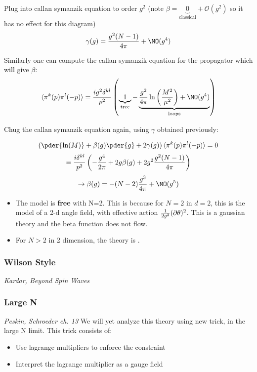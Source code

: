 \documentclass[11pt]{scrartcl}
\begin{document}
Plug into callan symanzik equation to order $g^2$ (note $\beta = \underbrace{0}_{\text{classical}} + \mathcal{O}(g^2)$ so it has no effect for this diagram)
\[\gamma(g) = {g^2 (N-1) \over 4 \pi} + \MO(g^4)\]

Similarly one can compute the callan symanzik equation
for the propagator which will give $\beta$:
\begin{align}
	\braket{\pi^k(p) \pi^l(-p)} ={i g^2 \delta^{kl} \over p^2}  \left(\underbrace{1}_{\text{tree}} - \underbrace{{g^2 \over 4 \pi} \ln \left({M^2 \over \mu^2} \right)  + \MO(g^4)}_{\text{loops}} \right)
	\end{align}

Chug the callan symanzik equation again, using $\gamma$ obtained previously:

\[ \left( \pder{\ln(M)} + \beta(g) \pder{g} + 2 \gamma(g) \right) \braket{\pi^k(p) \pi^l(-p)} = 0 \]
\[= {i \delta^{kl} \over p^2} \left(- {g^4 \over 2 \pi} + 2g \beta(g) + 2 g^2 {g^2 (N-1) \over 4 \pi} \right)\]
\[\rightarrow \beta(g) = - (N-2) {g^3 \over 4 \pi} + \MO(g^5)\]

\begin{itemize}
	\item  The model is \textbf{free} with N=2.  This is because for $N=2$ in $d=2$, this is the model of a 2-d angle field, with effective action ${1 \over 2 g^2} (\partial \theta)^2$.  This is a gaussian theory and the beta function does not flow.
	\item For $N>2$ in 2 dimension, the theory is .
	\end{itemize}

\subsubsection{Wilson Style}
\emph{Kardar, Beyond Spin Waves}

\subsubsection{Large N}
\emph{Peskin, Schroeder ch. 13}
We will yet analyze this theory using new trick, in the large N limit.  This trick consists of:
\begin{itemize}
	\item Use lagrange multipliers to enforce the constraint
	\item Interpret the lagrange multiplier as a gauge field
	\end{itemize}
\end{document}
